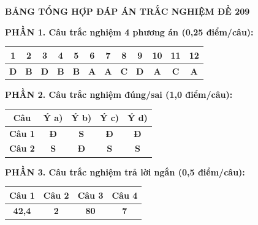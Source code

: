 \documentclass[12pt,a4paper]{article}
\begin{document}
\bigskip
\begin{center}
\textbf{\large BẢNG TỔNG HỢP ĐÁP ÁN TRẮC NGHIỆM ĐỀ 209}
\end{center}

\smallskip
\noindent
\textbf{PHẦN 1. Câu trắc nghiệm 4 phương án (0,25 điểm/câu):}
\begin{center}
\begin{tabular}{|c|c|c|c|c|c|c|c|c|c|c|c|}
\hline
\textbf{1} & \textbf{2} & \textbf{3} & \textbf{4} & \textbf{5} & \textbf{6} & \textbf{7} & \textbf{8} & \textbf{9} & \textbf{10} & \textbf{11} & \textbf{12} \\
\hline
\textbf{D} & \textbf{B} & \textbf{D} & \textbf{B} & \textbf{B} & \textbf{A} & \textbf{A} & \textbf{C} & \textbf{D} & \textbf{A} & \textbf{C} & \textbf{A} \\
\hline
\end{tabular}
\end{center}

\smallskip
\noindent
\textbf{PHẦN 2. Câu trắc nghiệm đúng/sai (1,0 điểm/câu):}
\begin{center}
\begin{tabular}{|c|c|c|c|c|}
\hline
\textbf{Câu} & \textbf{Ý a)} & \textbf{Ý b)} & \textbf{Ý c)} & \textbf{Ý d)} \\
\hline
\textbf{Câu 1} & \textbf{Đ} & \textbf{S} & \textbf{Đ} & \textbf{Đ} \\
\hline
\textbf{Câu 2} & \textbf{S} & \textbf{Đ} & \textbf{S} & \textbf{S} \\
\hline
\end{tabular}
\end{center}

\smallskip
\noindent
\textbf{PHẦN 3. Câu trắc nghiệm trả lời ngắn (0,5 điểm/câu):}
\begin{center}
\begin{tabular}{|c|c|c|c|}
\hline
\textbf{Câu 1} & \textbf{Câu 2} & \textbf{Câu 3} & \textbf{Câu 4} \\
\hline
\textbf{42,4} & \textbf{2} & \textbf{80} & \textbf{7} \\
\hline
\end{tabular}
\end{center}
\end{document}
